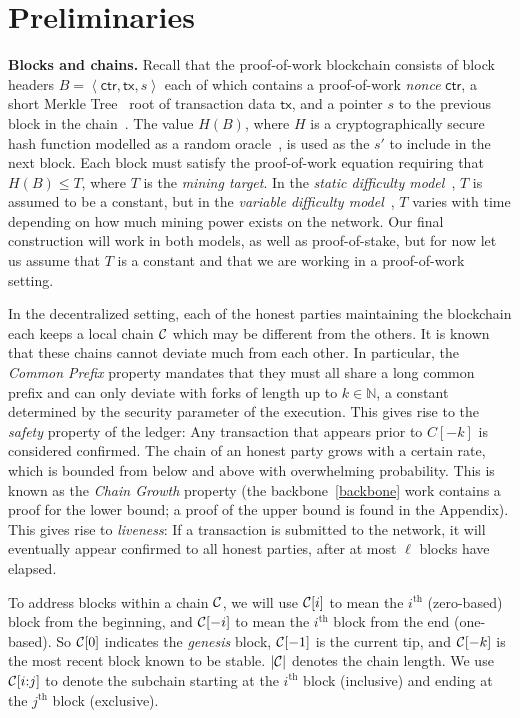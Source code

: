 \section{Preliminaries}

\noindent
\textbf{Blocks and chains.}
Recall that
the proof-of-work blockchain consists of block headers $B = \left<\textsf{ctr}, \textsf{tx}, s\right>$ each of
which contains a proof-of-work \emph{nonce} $\textsf{ctr}$, a short Merkle Tree~\cite{merkle}
root of transaction
data $\textsf{tx}$, and a pointer $s$ to the previous block in the chain~\cite{backbone}. The value $H(B)$, where
$H$ is a cryptographically secure hash function modelled as a random oracle~\cite{ro}, is used as the $s'$
to include in the next block. Each block must satisfy the proof-of-work equation requiring that
$H(B) \leq T$, where $T$ is the \emph{mining target}. In the \emph{static difficulty model}~\cite{backbone,backbone-new},
$T$ is assumed to be a constant, but in the \emph{variable difficulty model}~\cite{varbackbone}, $T$ varies with
time depending on how much mining power exists on the network. Our final construction will work
in both models, as well as proof-of-stake, but for now let us assume that $T$ is a constant and
that we are working in a proof-of-work setting.

In the decentralized setting, each of the honest parties maintaining the blockchain each keeps a local
chain $\mathcal{C}$ which may be different from the others. It is known~\cite{backbone} that these chains
cannot deviate much from each other. In particular, the \emph{Common Prefix} property mandates
that they must all share a long common prefix and can only deviate with forks of length up
to $k \in \mathbb{N}$, a constant determined by the security parameter of the execution.
This gives rise to the \emph{safety} property of the ledger: Any transaction that appears
prior to $C[-k]$ is considered confirmed. The chain of an honest party grows with a certain
rate, which is bounded from below and above with overwhelming probability. This is known as
the \emph{Chain Growth} property (the backbone~\ref{backbone} work contains a proof for the
lower bound; a proof of the upper bound is found in the Appendix).
This gives rise to \emph{liveness}: If a
transaction is submitted to the network, it will eventually appear confirmed to all honest parties,
after at most $\ell$ blocks have elapsed.

To address blocks within a chain $\mathcal{C}$, we will use $\mathcal{C}[i]$ to mean the $i^\text{th}$ (zero-based)
block from the beginning, and $\mathcal{C}[-i]$ to mean the $i^\text{th}$ block from the end (one-based).
So $\mathcal{C}[0]$ indicates the \emph{genesis} block, $\mathcal{C}[-1]$ is the current tip, and $\mathcal{C}[-k]$
is the most recent block known to be stable. $|\mathcal{C}|$ denotes the chain length. We use $\mathcal{C}[i{:}j]$
to denote the subchain starting at the $i^\text{th}$ block (inclusive) and ending at the $j^\text{th}$
block (exclusive).

